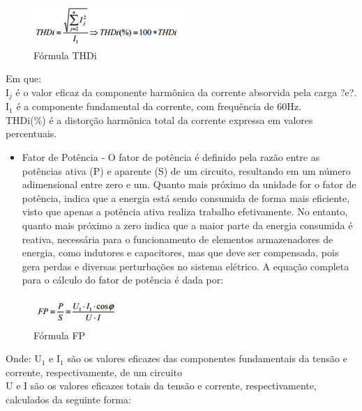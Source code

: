 \begin{figure}[h!]
	 \centering
	\label{FormulaTHDI}
	 \includegraphics[keepaspectratio=true,scale=0.8]{figuras/FormulaTHDI.png}
	 \caption{F\'ormula THDi}
\end{figure}

Em que: \\ I$_{j}$ \'e o valor eficaz da componente harm\^onica da corrente absorvida pela carga ?e?. \\ I$_{1}$ \'e a componente fundamental da corrente, com frequ\^encia de 60Hz. \\ THDi(\%) \'e a distor\c{c}\~ao harm\^onica total da corrente expressa em valores percentuais.

\begin{itemize}
        \item Fator de Pot\^encia - O fator de pot\^encia \'e definido pela raz\~ao entre as pot\^encias ativa (P) e aparente (S) de um circuito, resultando em um n\'umero adimensional entre zero e um. Quanto mais pr\'oximo da unidade for o fator de pot\^encia, indica que a energia est\'a sendo consumida de forma mais eficiente, visto que apenas a pot\^encia ativa realiza trabalho efetivamente. No entanto, quanto mais pr\'oximo a zero indica que a maior parte da energia consumida \'e reativa, necess\'aria para o funcionamento de elementos armazenadores de energia, como indutores e capacitores, mas que deve ser compensada, pois gera perdas e diversas perturba\c{c}\~oes no sistema el\'etrico. A equa\c{c}\~ao completa para o c\'alculo do fator de pot\^encia \'e dada por:
\end{itemize}

\begin{figure}[h!]
	 \centering
	\label{FormulaFP}
	 \includegraphics[keepaspectratio=true,scale=0.8]{figuras/FormulaFP.png}
	 \caption{F\'ormula FP}
\end{figure}

Onde: U$_{1}$ e I$_{1}$ s\~ao os valores eficazes das componentes fundamentais da tens\~ao e corrente, respectivamente, de um circuito \\
U e I s\~ao os valores eficazes totais da tens\~ao e corrente, respectivamente, calculados da seguinte forma:

